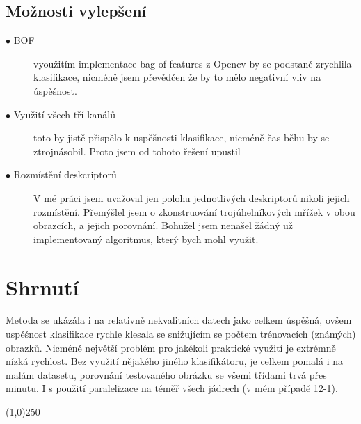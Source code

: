 \documentclass[a4paper,10pt,twocolumn]{article}
\begin{document}
\subsection{ Možnosti vylepšení}

\begin{description}
    \item[$\bullet$ BOF]  vyoužitím implementace bag of features z Opencv by se podstaně zrychlila klasifikace, nicméně jsem převědčen že by to mělo negativní vliv na úspěšnost.
    \item[$\bullet$ Využití všech tří kanálů] toto by jistě přispělo k uspěšnosti klasifikace, nicméně čas běhu by se ztrojnásobil. Proto jsem od tohoto řešení upustil
    \item[$\bullet$ Rozmístění deskcriptorů] V mé práci jsem uvažoval jen polohu jednotlivých deskriptorů nikoli jejich rozmístění. Přemýšlel jsem o zkonstruování trojúhelníkových mřížek v obou obrazcích, a jejich porovnání. Bohužel jsem nenašel žádný už implementovaný algoritmus, který bych mohl využit.
\end{description}

%
\section{Shrnutí}

Metoda se ukázála i na relativně nekvalitních datech jako celkem úspěšná, ovšem uspěšnost klasifikace rychle klesala se snižujícím se počtem trénovacích (známých) obrazků.
Nicméně největší problém pro jakékoli praktické využití je extrémně nízká rychlost.
Bez využití nějakého jiného klasifikátoru, je celkem pomalá i na malám datasetu, porovnání testovaného obrázku se všemi třídami trvá přes minutu.
I s použití paralelizace na téměř všech jádrech (v mém případě 12-1).
%


%


%

%
\vspace{-2mm}
\begin{center}
\line(1,0){250}
\end{center}
\vspace{-2mm}
\end{document}
